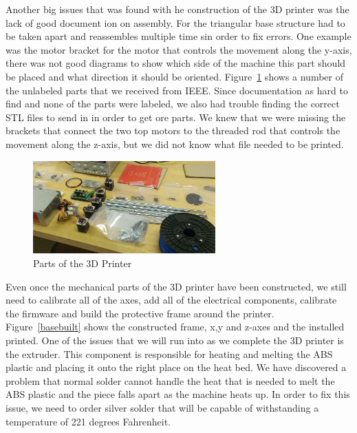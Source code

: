 \documentclass[pdftex,10.5pt]{report}
\begin{document}
Another big issues that was found with he construction of the 3D printer was the lack of good document ion on assembly. For the triangular base structure had to be taken apart and reassembles multiple time sin order to fix errors. One example was the motor bracket for the motor that controls the movement along the y-axis, there was not good diagrams to show which side of the machine this part should be placed and what direction it should be oriented. Figure~\ref{parts} shows a number of the unlabeled parts that we received from IEEE. Since documentation as hard to find and none of the parts were labeled, we also had trouble finding the correct STL files to send in in order to get ore parts. We knew that we were missing the brackets that connect the two top motors to the threaded rod that controls the movement along the z-axis, but we did not know what file needed to be printed.

\begin{figure}[H]
	\centering
	\includegraphics[width=70mm]{figures/WP_20130223_002.jpg}
	\caption{Parts of the 3D Printer}
	\label{parts}
\end{figure}

Even once the mechanical parts of the 3D printer have been constructed, we still need to calibrate all of the axes, add all of the electrical components, calibrate the firmware and build the protective frame around the printer. Figure~\ref{basebuilt} shows the constructed frame, x,y and z-axes and the installed printed. One of the issues that we will run into as we complete the 3D printer is the extruder. This component is responsible for heating and melting the ABS plastic and placing it onto the right place on the heat bed. We have discovered a problem that normal solder cannot handle the heat that is needed to melt the ABS plastic and the piece falls apart as the machine heats up. In order to fix this issue, we need to order silver solder that will be capable of withstanding a temperature of 221 degrees Fahrenheit. 
\end{document}
